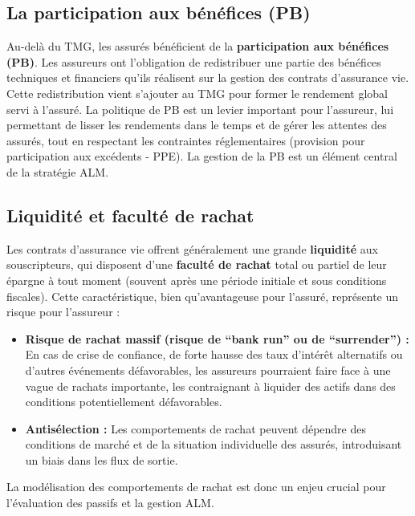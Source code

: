 \subsection{La participation aux bénéfices (PB)}
\label{subsec:participation_benefices}
Au-delà du TMG, les assurés bénéficient de la \textbf{participation aux bénéfices (PB)}. Les assureurs ont l'obligation de redistribuer une partie des bénéfices techniques et financiers qu'ils réalisent sur la gestion des contrats d'assurance vie. Cette redistribution vient s'ajouter au TMG pour former le rendement global servi à l'assuré. La politique de PB est un levier important pour l'assureur, lui permettant de lisser les rendements dans le temps et de gérer les attentes des assurés, tout en respectant les contraintes réglementaires (provision pour participation aux excédents - PPE). La gestion de la PB est un élément central de la stratégie ALM.

\subsection{Liquidité et faculté de rachat}
\label{subsec:liquidite_rachat}
Les contrats d'assurance vie offrent généralement une grande \textbf{liquidité} aux souscripteurs, qui disposent d'une \textbf{faculté de rachat} total ou partiel de leur épargne à tout moment (souvent après une période initiale et sous conditions fiscales). Cette caractéristique, bien qu'avantageuse pour l'assuré, représente un risque pour l'assureur :
\begin{itemize}
    \item \textbf{Risque de rachat massif (risque de ``bank run'' ou de ``surrender'') :} En cas de crise de confiance, de forte hausse des taux d'intérêt alternatifs ou d'autres événements défavorables, les assureurs pourraient faire face à une vague de rachats importante, les contraignant à liquider des actifs dans des conditions potentiellement défavorables.
    \item \textbf{Antisélection :} Les comportements de rachat peuvent dépendre des conditions de marché et de la situation individuelle des assurés, introduisant un biais dans les flux de sortie.
\end{itemize}
La modélisation des comportements de rachat est donc un enjeu crucial pour l'évaluation des passifs et la gestion ALM.


